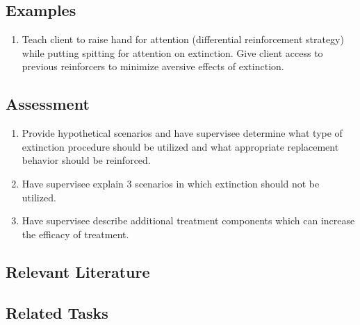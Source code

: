 \subsection{Examples}
\begin{enumerate}
\item Teach client to raise hand for attention (differential reinforcement strategy) while putting spitting for attention on extinction. Give client access to previous reinforcers to minimize aversive effects of extinction.
\end{enumerate}
%
\subsection{Assessment}
\begin{enumerate}
\item Provide hypothetical scenarios and have supervisee determine what type of extinction procedure should be utilized and what appropriate replacement behavior should be reinforced. 
\item Have supervisee explain 3 scenarios in which extinction should not be utilized. 
\item Have supervisee describe additional treatment components which can increase the efficacy of treatment.
\end{enumerate}
%
\subsection{Relevant Literature}
\begin{refsection}
\nocite{test,alang2017police,clayton2018black}
\printbibliography[heading=none]
\end{refsection}
%
\subsection{Related Tasks} 
\fourcThree{}\\
\fourdEighteen{}\\
\fourdNineteen{}\\
\fourjSix{}\\
\fourjSeven{}\\
\fourjNine{}\\
\fourjTen{}\\
%
%
%
%
%
%
